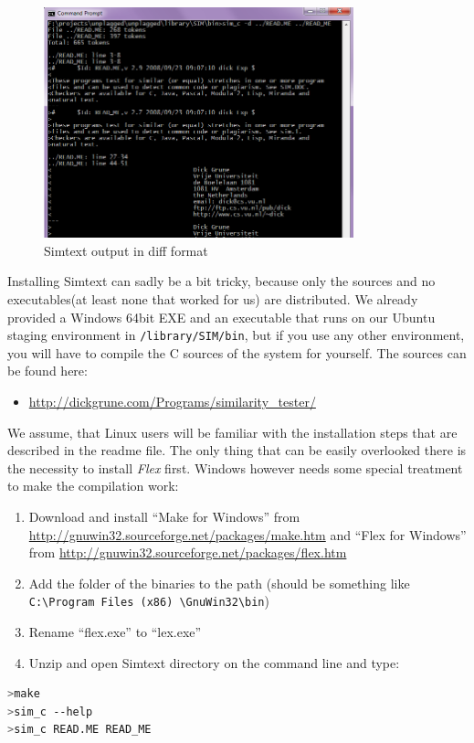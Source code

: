 \begin{figure}[htbp]
  \centering
    \includegraphics[width=0.8\textwidth]{images/simtext-output-diff.png}
  \caption{Simtext output in diff format}
  \label{fig:simtextDiff}
\end{figure}

Installing Simtext can sadly be a bit tricky, because only the sources and no executables(at least none that worked for us) 
are distributed. We already
provided a Windows 64bit EXE and an executable that runs on our Ubuntu staging environment in \texttt{/library/SIM/bin}, 
but if you use any other environment, you will have to compile the C sources of the system for yourself. The sources can
be found here:

\begin{itemize}
\item \url{http://dickgrune.com/Programs/similarity_tester/}
\end{itemize} 

We assume, that Linux users will be familiar with the installation steps that are described in the readme file. The only
thing that can be easily overlooked there is the necessity to install \textit{Flex} first. Windows
however needs some special treatment to make the compilation work:

\begin{enumerate}
\item Download and install \enquote{Make for Windows} from \url{http://gnuwin32.sourceforge.net/packages/make.htm} and 
\enquote{Flex for Windows} from \url{http://gnuwin32.sourceforge.net/packages/flex.htm}
\item Add the folder of the binaries to the path (should be something like 
\texttt{C:\textbackslash Program Files (x86) \textbackslash GnuWin32\textbackslash bin})
\item Rename \enquote{flex.exe} to \enquote{lex.exe}
\item Unzip and open Simtext directory on the command line and type:
\end{enumerate}
\begin{lstlisting}[caption=Installing and checking simtext, language=bash]
>make
>sim_c --help
>sim_c READ.ME READ_ME
\end{lstlisting}

